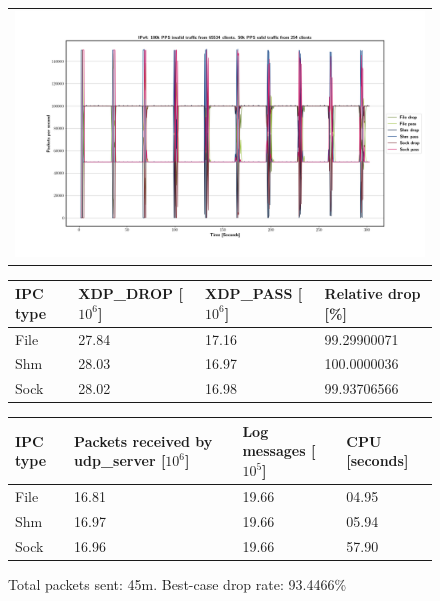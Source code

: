 \begin{figure}[!h]
	\centering
	\scriptsize
	\begin{tabular}{c}
    	\centerline{\includegraphics[width=1.2\textwidth]{images/IPv4_100k_65534_1.png}}
	\end{tabular}
	\begin{tabular}{llll}
		\toprule
		\textbf{IPC type} & \textbf{XDP\_DROP [$10^6$]} & \textbf{XDP\_PASS [$10^6$]} & \textbf{Relative drop [\%]} \\ \midrule 
		File & 27.84 & 17.16 & 99.29900071 \\
        Shm & 28.03 & 16.97 & 100.0000036 \\
        Sock & 28.02 & 16.98 & 99.93706566 \\
	\bottomrule
	\end{tabular}
    \begin{tabular}{llll}
		\toprule
		\textbf{IPC type} & \textbf{Packets received by udp\_server [$10^6$]} & \textbf{Log messages [$10^5$]} & \textbf{CPU [seconds]} \\ \midrule 
		File & 16.81 & 19.66 & 04.95 \\
        Shm & 16.97 & 19.66 & 05.94 \\
        Sock & 16.96 & 19.66 & 57.90 \\
	\bottomrule
	\end{tabular}
	\caption[Simplefail2ban, IPv4, 100k \ac{PPS}, 65,534 malicious clients]{Total packets sent: 45m. Best-case drop rate: 93.4466\%}
	\label{fig:data:ipv4:100k:65534}
\end{figure}


